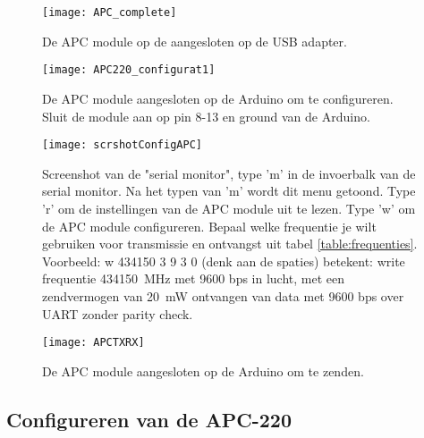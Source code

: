  
\begin{figure}
    \centering
    \texttt{[image: APC\_complete]}
    \caption{De APC module op de aangesloten op de USB adapter.}
   \label{fig:APC_complete}
\end{figure}

\begin{figure}
    \centering
    \texttt{[image: APC220\_configurat1]}
    \caption{De APC module aangesloten op de Arduino om te configureren.
    Sluit de module aan op pin 8-13 en ground van de Arduino.}
   \label{fig:APC220_configurat1}
\end{figure}

\begin{figure}
    \centering
    \texttt{[image: scrshotConfigAPC]}
    
    \caption{Screenshot van de "serial monitor", type 'm' in de invoerbalk
    van de serial monitor. Na het typen van 'm' wordt dit menu getoond.
    Type 'r' om de instellingen van de APC module uit te lezen. Type 'w'
    om de APC module configureren. Bepaal welke frequentie je wilt
    gebruiken voor transmissie en ontvangst uit tabel \ref{table:frequenties}.
    Voorbeeld: w 434150 3 9 3 0 (denk aan de spaties) betekent: write
    frequentie \SI{434150}{\MHz} met 9600 bps in lucht, met een zendvermogen van
    \SI{20}{\milli\watt} ontvangen van data met 9600 bps over UART zonder parity
    check.}
   
   \label{fig:scrshotConfigAPC}
\end{figure}

\begin{figure}
    \centering
    \texttt{[image: APCTXRX]}
    \caption{De APC module aangesloten op de Arduino om te zenden.}
   \label{fig:APCTXRX}
\end{figure}

\subsection{Configureren van de APC-220}

